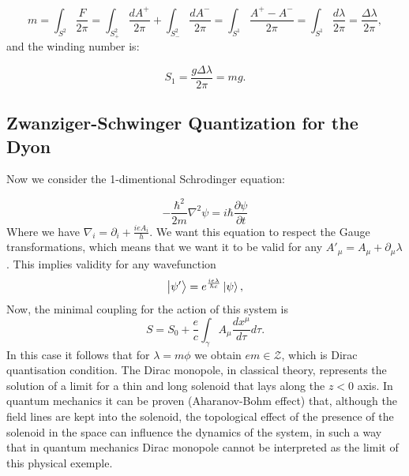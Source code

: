 \documentclass[main.tex]{subfiles}
\begin{document}
\begin{equation}
m=\int_{S^2}\frac{F}{2\pi}=\int_{S^2_+}\frac{dA^+}{2\pi}+\int_{S^2_-}\frac{dA^-}{2\pi}=\int_{S^1}\frac{A^+-A^-}{2\pi}=\int_{S^1}\frac{d\lambda}{2\pi}=\frac{\Delta\lambda}{2\pi},
\end{equation}
and the winding number is:

\begin{equation}
S_1=\frac{g\Delta\lambda}{2\pi}=mg.
\end{equation}
\subsection{Zwanziger-Schwinger Quantization for the Dyon}

Now we consider the 1-dimentional Schrodinger equation:

\begin{equation}
    -\frac{\hbar^2}{2m}\nabla^2\psi=i\hbar\frac{\partial\psi}{\partial t}
\end{equation}
Where we have $\nabla_i=\partial_i+\frac{ie A_i}{h}$. We want this equation to respect the Gauge transformations, which means that we want it to be valid for any $A'_{\mu}=A_{\mu}+\partial_{\mu}\lambda$. This implies validity for any wavefunction
\begin{equation}
\ket{\psi'}=e^{\frac{ie\lambda}{\hbar c}}\ket{\psi},
\end{equation}
Now, the minimal coupling for the action of this system is
\begin{equation}
S=S_0+\frac{e}{c}\int_{\gamma}A_{\mu}\frac{dx^{\mu}}{d\tau}d\tau.
\end{equation}
In this case it follows
that for $\lambda=m\phi$ we obtain $em\in \mathcal{Z}$, which is Dirac quantisation condition. The Dirac monopole, in classical theory, represents the solution of a limit for a thin and long solenoid that lays along the $z<0$ axis. In quantum mechanics it can be proven (Aharanov-Bohm effect) that, although the field lines are kept into the solenoid, the topological effect of the presence of the solenoid in the space can influence the dynamics of the system, in such a way that in quantum mechanics Dirac monopole cannot be interpreted as the limit of this physical exemple.
\end{document}
